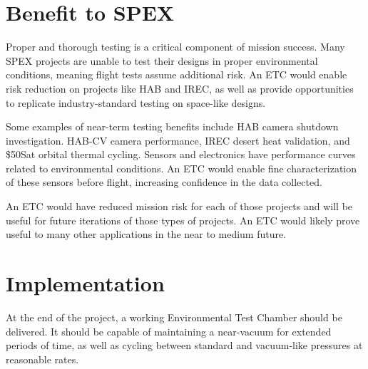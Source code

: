\documentclass[conference]{IEEEtran} %
\begin{document}

\section{Benefit to SPEX}
\label{sec:benefit}

Proper and thorough testing is a critical component of mission success. Many SPEX projects are unable to test their designs in proper environmental conditions, meaning flight tests assume additional risk. An ETC would enable risk reduction on projects like HAB and IREC, as well as provide opportunities to replicate industry-standard testing on space-like designs.\@

Some examples of near-term testing benefits include HAB camera shutdown investigation. HAB-CV camera performance, IREC desert heat validation, and \$50Sat orbital thermal cycling. Sensors and electronics have performance curves related to environmental conditions. An ETC would enable fine characterization of these sensors before flight, increasing confidence in the data collected.\@

An ETC would have reduced mission risk for each of those projects and will be useful for future iterations of those types of projects. An ETC would likely prove useful to many other applications in the near to medium future.



\section{Implementation}
\label{sec:implementation}
  At the end of the project, a working Environmental Test Chamber should be delivered. It should be capable of maintaining a near-vacuum for extended periods of time, as well as cycling between standard and vacuum-like pressures at reasonable rates.
\end{document}

